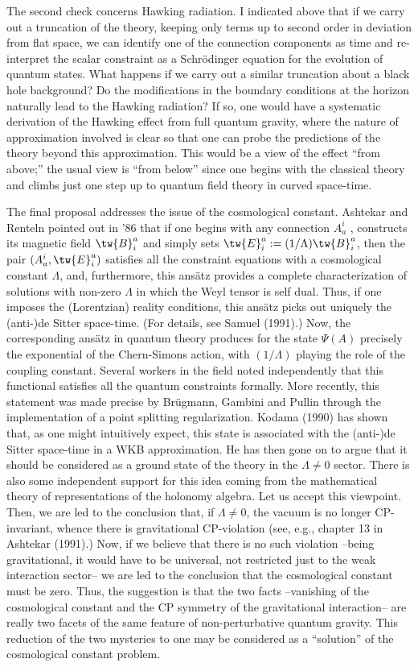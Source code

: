 The second check concerns Hawking radiation. I indicated
above that if we carry out a truncation of the theory, keeping only terms
up to second order in deviation from flat space, we can identify one of the
connection components as time and re-interpret the scalar constraint as a
Schr\"odinger equation for the evolution of quantum states. What happens if
we carry out a similar truncation about a black hole background? Do the
modifications in the boundary conditions at the horizon naturally lead to
the Hawking radiation? If so, one would have a systematic derivation of
the Hawking effect from full quantum gravity, where the nature of
approximation involved is clear so that one can probe the predictions of
the theory beyond this approximation. This would be a view of the effect
``from above;'' the usual view is ``from below'' since one begins
with the classical theory and climbs just one step up to quantum field
theory in curved space-time.

The final proposal addresses the issue of the
cosmological constant. Ashtekar and Renteln pointed out in '86 that if one
begins with any connection $A_a^i$ , constructs its magnetic field
$\tw{B}^a_i$ and simply sets $\tw{E}^a_i := (1/\Lambda) \tw{B}^a_i$, then
the pair $(A_a^i, \tw{E}^a_i)$ satisfies all the constraint equations with
a cosmological constant $\Lambda$, and, furthermore, this ans\"atz provides
a complete characterization of solutions with non-zero $\Lambda$ in which the
Weyl tensor is self dual. Thus, if one imposes the (Lorentzian) reality
conditions, this ans\"atz picks out uniquely the (anti-)de Sitter space-time.
(For details, see Samuel (1991).) Now, the corresponding ans\"atz in quantum
theory produces for the state $\Psi(A)$ precisely the exponential of the
Chern-Simons action, with $(1/\Lambda)$ playing the role of the coupling
constant. Several workers in the field noted independently that this functional
satisfies all the quantum constraints formally. More recently, this statement
was made precise by Br\"ugmann, Gambini and Pullin through the
implementation of a point splitting regularization. Kodama (1990) has shown
that, as one might intuitively expect, this state is associated with the
(anti-)de Sitter space-time in a WKB approximation. He has then gone on to
argue that it should be considered as a ground state of the theory in the
$\Lambda\not= 0$ sector. There is also some independent support for
this idea coming from the mathematical theory of representations of the
holonomy algebra. Let us accept this viewpoint. Then, we are led to the
conclusion that, if $\Lambda \not= 0$, the vacuum is no longer CP-invariant,
whence there is gravitational CP-violation (see, e.g., chapter 13 in Ashtekar
(1991).) Now, if we believe that there is no such violation  --being
gravitational, it would have to be universal, not restricted just to the weak
interaction sector-- we are led to the conclusion that
the cosmological constant must be zero. Thus, the suggestion is that the
two facts --vanishing of the cosmological constant and the CP symmetry of
the gravitational interaction-- are really two facets of the same feature
of non-perturbative quantum gravity. This reduction of the two mysteries to
one may be considered as a ``solution'' of the cosmological constant problem.

